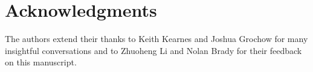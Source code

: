 \documentclass{article}
\theoremstyle{plain}
\theoremstyle{definition}
\theoremstyle{remark}
\begin{document}
\section*{Acknowledgments}
The authors extend their thanks to Keith Kearnes and Joshua Grochow for many insightful conversations and to Zhuoheng Li and Nolan Brady for their feedback on this manuscript.




\newpage
\appendix
\onecolumn
\end{document}

